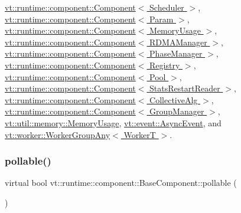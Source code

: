 \hyperlink{structvt_1_1runtime_1_1component_1_1_component_a7f07384d294e59796add9ce6be2d6410}{vt\+::runtime\+::component\+::\+Component$<$ Scheduler $>$}, \hyperlink{structvt_1_1runtime_1_1component_1_1_component_a7f07384d294e59796add9ce6be2d6410}{vt\+::runtime\+::component\+::\+Component$<$ Param $>$}, \hyperlink{structvt_1_1runtime_1_1component_1_1_component_a7f07384d294e59796add9ce6be2d6410}{vt\+::runtime\+::component\+::\+Component$<$ Memory\+Usage $>$}, \hyperlink{structvt_1_1runtime_1_1component_1_1_component_a7f07384d294e59796add9ce6be2d6410}{vt\+::runtime\+::component\+::\+Component$<$ R\+D\+M\+A\+Manager $>$}, \hyperlink{structvt_1_1runtime_1_1component_1_1_component_a7f07384d294e59796add9ce6be2d6410}{vt\+::runtime\+::component\+::\+Component$<$ Phase\+Manager $>$}, \hyperlink{structvt_1_1runtime_1_1component_1_1_component_a7f07384d294e59796add9ce6be2d6410}{vt\+::runtime\+::component\+::\+Component$<$ Registry $>$}, \hyperlink{structvt_1_1runtime_1_1component_1_1_component_a7f07384d294e59796add9ce6be2d6410}{vt\+::runtime\+::component\+::\+Component$<$ Pool $>$}, \hyperlink{structvt_1_1runtime_1_1component_1_1_component_a7f07384d294e59796add9ce6be2d6410}{vt\+::runtime\+::component\+::\+Component$<$ Stats\+Restart\+Reader $>$}, \hyperlink{structvt_1_1runtime_1_1component_1_1_component_a7f07384d294e59796add9ce6be2d6410}{vt\+::runtime\+::component\+::\+Component$<$ Collective\+Alg $>$}, \hyperlink{structvt_1_1runtime_1_1component_1_1_component_a7f07384d294e59796add9ce6be2d6410}{vt\+::runtime\+::component\+::\+Component$<$ Group\+Manager $>$}, \hyperlink{structvt_1_1util_1_1memory_1_1_memory_usage_add66c6cdabed24194310380c5a28951a}{vt\+::util\+::memory\+::\+Memory\+Usage}, \hyperlink{structvt_1_1event_1_1_async_event_ac8d9f977b1cca3f43a06d0e83bc88e3d}{vt\+::event\+::\+Async\+Event}, and \hyperlink{structvt_1_1worker_1_1_worker_group_any_ad8bb855b98bf26337ca13df2bff5fb95}{vt\+::worker\+::\+Worker\+Group\+Any$<$ Worker\+T $>$}.

\mbox{\label{structvt_1_1runtime_1_1component_1_1_base_component_ab651a49e6d4d3d8ca9e82a6b4b10af66}} 
\subsubsection{\texorpdfstring{pollable()}{pollable()}}
{\footnotesize\ttfamily virtual bool vt\+::runtime\+::component\+::\+Base\+Component\+::pollable (\begin{DoxyParamCaption}{ }\end{DoxyParamCaption})\hspace{0.3cm}{\ttfamily [pure virtual]}}



